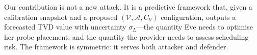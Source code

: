 \documentclass[ASNA,twocolumn]{USG}
\providecommand{\DIFdelbeginFL}{} %
\begin{document}
Our contribution is not a new attack. It is a predictive framework that, given a calibration snapshot and a proposed $(\mathcal{V}, \mathcal{A}, C_V)$ configuration, outputs a forecasted TVD value with uncertainty $\sigma_L$---the quantity Eve needs to optimise her probe placement, and the quantity the provider needs to assess scheduling risk. The framework is symmetric: it serves both attacker and defender.

\begin{figure}[t]
\centering
\DIFdelbeginFL %





\end{figure}
\end{document}
